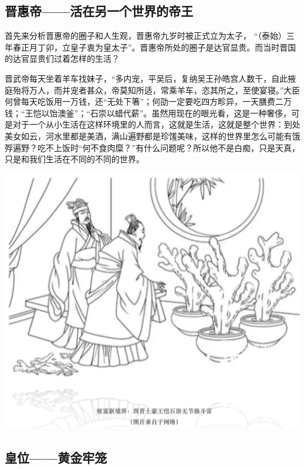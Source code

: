 \documentclass[
]{book}
\begin{document}
\hypertarget{ux664bux60e0ux5e1dux6d3bux5728ux53e6ux4e00ux4e2aux4e16ux754cux7684ux5e1dux738b}{%
\subsection{晋惠帝------活在另一个世界的帝王}\label{ux664bux60e0ux5e1dux6d3bux5728ux53e6ux4e00ux4e2aux4e16ux754cux7684ux5e1dux738b}}

首先来分析晋惠帝的圈子和人生观，晋惠帝九岁时被正式立为太子， ``（泰始）三年春正月丁卯，立皇子衷为皇太子''。晋惠帝所处的圈子是达官显贵。而当时晋国的达官显贵们过着怎样的生活？

晋武帝每天坐着羊车找妹子，``多内宠，平吴后，复纳吴王孙皓宫人数千，自此掖庭殆将万人，而并宠者甚众，帝莫知所适，常乘羊车，恣其所之，至使宴寝。''大臣何曾每天吃饭用一万钱，还``无处下箸''；何劭一定要吃四方畛异，一天膳费二万钱；``王恺以饴澳釜''；``石崇以蜡代薪''。虽然用现在的眼光看，这是一种奢侈，可是对于一个从小生活在这样环境里的人而言，这就是生活，这就是整个世界：到处美女如云，河水里都是美酒，满山遍野都是珍馐美味，这样的世界里怎么可能有饿殍遍野？吃不上饭时``何不食肉糜？''有什么问题呢？所以他不是白痴，只是天真，只是和我们生活在不同的不同的世界。

\includegraphics[width=6.67in]{images/his5}

\hypertarget{ux7687ux4f4dux9ec4ux91d1ux7262ux7b3c}{%
\subsection{皇位------黄金牢笼}\label{ux7687ux4f4dux9ec4ux91d1ux7262ux7b3c}}
\end{document}
